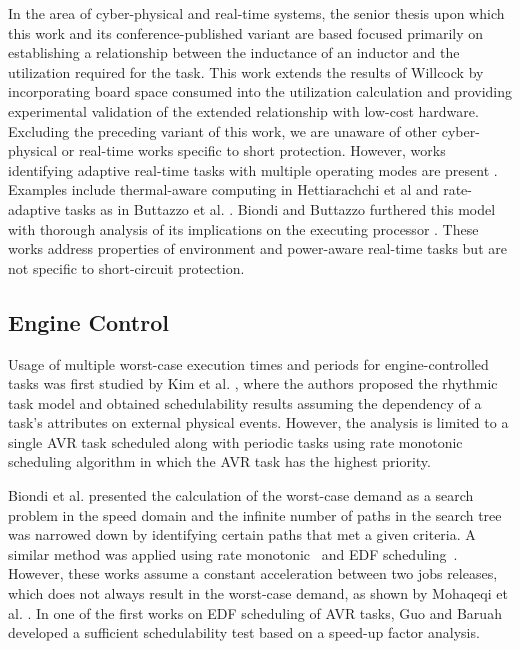 In the area of cyber-physical and real-time systems, the senior thesis \cite{seniorThesis} upon which this work and its conference-published variant \cite{tufc} are based focused primarily on establishing a relationship between the inductance of an inductor and the utilization required for the task.
This work extends the results of Willcock \cite{seniorThesis} by incorporating board space consumed into the utilization calculation and providing experimental validation of the extended relationship with low-cost hardware. Excluding the preceding variant of this work, we are unaware of other cyber-physical or real-time works specific to short protection. However, works identifying adaptive real-time tasks with multiple operating modes are present \cite{modeChangeSystems}. Examples include thermal-aware computing in Hettiarachchi et al \cite{thermalAware} and rate-adaptive tasks as in Buttazzo et al. \cite{rateAdaptive}. Biondi and Buttazzo furthered this model with thorough analysis of its implications on the executing processor \cite{engineCtrl}.
These works address properties of environment and power-aware real-time tasks but are not specific to short-circuit protection.

\subsection{Engine Control} \label{subsec:engCtrl-relatedWork}

Usage of multiple worst-case execution times and periods for engine-controlled tasks was first studied by Kim et al. \cite{Rhythmictask}, where the authors proposed the rhythmic task model and obtained schedulability results assuming the dependency of a task's attributes on external physical events.
However, the analysis is limited to a single AVR task scheduled along with periodic tasks using rate monotonic scheduling algorithm in which the AVR task has the highest priority.

Biondi et al. \cite{2014Biondi} presented the calculation of the worst-case demand as a search problem in the speed domain and the infinite number of paths in the search tree was narrowed down by identifying certain paths that met a given criteria.
A similar method was applied using rate monotonic~\cite{reponseTime} and EDF scheduling~\cite{Feasibility}.
However, these works assume a constant acceleration between two jobs releases, which does not always result in the worst-case demand, as shown by Mohaqeqi et al. \cite{DRTPaper}.
In one of the first works on EDF scheduling of AVR tasks, Guo and Baruah~\cite{guoPaper} developed a sufficient schedulability test based on a speed-up factor analysis. %

